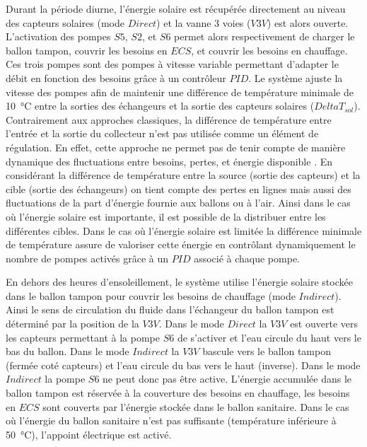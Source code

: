 Durant la période diurne, l’énergie solaire est récupérée directement au niveau des
capteurs solaires (mode $Direct$) et la vanne 3 voies ($V3V$) est alors ouverte. L’activation des
pompes $S5$, $S2$, et $S6$ permet alors respectivement de charger le ballon tampon,
couvrir les besoins en $ECS$, et couvrir les besoins en chauffage. Ces trois pompes
sont des pompes à vitesse variable permettant d’adapter le débit en fonction des besoins
grâce à un contrôleur $PID$. Le système ajuste la vitesse des pompes afin de maintenir une
différence de température minimale de \SI{10}{\celsius} entre la sorties des échangeurs et
la sortie des capteurs solaires ($DeltaT_{sol}$). Contrairement aux approches classiques, la différence de
température entre l’entrée et la sortie du collecteur n’est pas utilisée comme un élément
de régulation. En effet, cette approche ne permet pas de tenir compte de manière dynamique
des fluctuations entre besoins, pertes, et énergie disponible \parencite{Mosallat2013686}.
En considérant la différence de température entre la source (sortie des capteurs) et la
cible (sortie des échangeurs) on tient compte des pertes en lignes mais aussi des
fluctuations de la part d’énergie fournie aux ballons ou à l’air. Ainsi dans le cas où
l’énergie solaire est importante, il est possible de la distribuer
entre les différentes cibles. Dans le cas où l’énergie solaire est limitée la différence
minimale de température assure de valoriser cette énergie en contrôlant dynamiquement le
nombre de pompes activés grâce à un $PID$ associé à chaque pompe.

En dehors des heures d’ensoleillement, le système utilise l’énergie solaire stockée dans le
ballon tampon pour couvrir les besoins de chauffage (mode $Indirect$). Ainsi le sens de
circulation du fluide dans l’échangeur du ballon tampon est déterminé par la position de
la $V3V$. Dans le mode $Direct$ la $V3V$ est ouverte vers les capteurs
permettant à la pompe $S6$ de s’activer et l’eau circule du haut vers le bas du ballon.
Dans le mode $Indirect$ la $V3V$ bascule vers le ballon tampon (fermée coté
capteurs) et l’eau circule du bas vers le haut (inverse). Dans le mode $Indirect$ la pompe
$S6$ ne peut donc pas être active. L’énergie accumulée dans le ballon tampon est réservée
à la couverture des besoins en chauffage, les besoins en $ECS$ sont couverts par
l’énergie stockée dans le ballon sanitaire. Dans le cas où l’énergie du ballon sanitaire
n’est pas suffisante (température inférieure à \SI{50}{\celsius}), l’appoint électrique est
activé.

